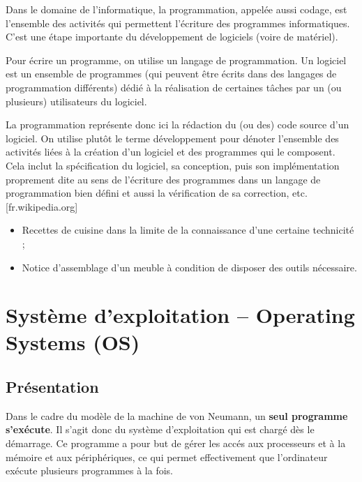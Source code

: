 \begin{defi}[Programmation]
Dans le domaine de l'informatique, la programmation, appelée aussi codage, est l'ensemble des activités qui permettent l'écriture des programmes informatiques. C'est une étape importante du développement de logiciels (voire de matériel).

Pour écrire un programme, on utilise un langage de programmation. Un logiciel est un ensemble de programmes (qui peuvent être écrits dans des langages de programmation différents) dédié à la réalisation de certaines tâches par un (ou plusieurs) utilisateurs du logiciel.

La programmation représente donc ici la rédaction du (ou des) code source d'un logiciel. On utilise plutôt le terme développement pour dénoter l'ensemble des activités liées à la création d'un logiciel et des programmes qui le composent. Cela inclut la spécification du logiciel, sa conception, puis son implémentation proprement dite au sens de l'écriture des programmes dans un langage de programmation bien défini et aussi la vérification de sa correction, etc. [fr.wikipedia.org]
\end{defi}




\begin{exemple}

\begin{itemize}
\item Recettes de cuisine dans la limite de la connaissance d'une certaine technicité ;
\item Notice d'assemblage d'un meuble à condition de disposer des outils nécessaire.
\end{itemize}
\end{exemple}








\section{Système d'exploitation -- Operating Systems (OS)}
\subsection{Présentation}

Dans le cadre du modèle de la machine de von Neumann, un\textbf{ seul programme s’exécute}. Il s'agit donc du système d'exploitation qui est chargé dès le démarrage.  Ce programme a pour but de gérer les accés aux processeurs et à la mémoire et aux périphériques, ce qui permet
effectivement que l’ordinateur exécute plusieurs programmes à la fois.

